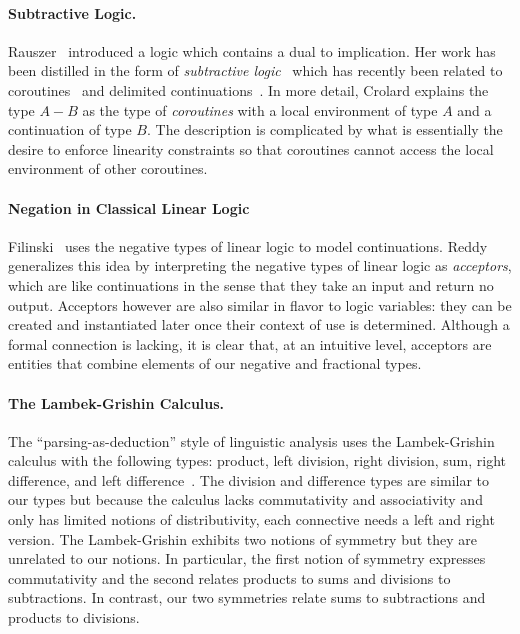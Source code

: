 \documentclass[preprint]{sigplanconf}
\begin{document}
\paragraph*{Subtractive Logic.} 
Rauszer~\cite{springerlink:10.1007/BF02120864,rauszer,rauszer2} introduced a
logic which contains a dual to implication. Her work has been distilled in
the form of \emph{subtractive logic}~\cite{Crolard01} which has recently been
related to coroutines~\cite{Crolard01082004} and delimited
continuations~\cite{Ariola:2009:TFD:1743339.1743381}.  In more detail,
Crolard explains the type $A-B$ as the type of \emph{coroutines} with a local
environment of type $A$ and a continuation of type $B$. The description is
complicated by what is essentially the desire to enforce linearity
constraints so that coroutines cannot access the local environment of other
coroutines. 

\paragraph*{Negation in Classical Linear Logic} 
Filinski~\cite{Filinski92} uses the negative types of linear logic to model
continuations. Reddy~\cite{Reddy91} generalizes this idea by interpreting the
negative types of linear logic as \emph{acceptors}, which are like
continuations in the sense that they take an input and return no
output. Acceptors however are also similar in flavor to logic variables:
they can be created and instantiated later once their context of use is
determined. Although a formal connection is lacking, it is clear that, at an
intuitive level, acceptors are entities that combine elements of our negative
and fractional types.

\paragraph*{The Lambek-Grishin Calculus.} The ``parsing-as-deduction'' style
of linguistic analysis uses the Lambek-Grishin calculus with the following
types: product, left division, right division, sum, right difference, and
left difference~\cite{Bernardi:2010:CSL:1749618.1749689}. The division and
difference types are similar to our types but because the calculus lacks
commutativity and associativity and only has limited notions of
distributivity, each connective needs a left and right version. The
Lambek-Grishin exhibits two notions of symmetry but they are unrelated to our
notions. In particular, the first notion of symmetry expresses commutativity
and the second relates products to sums and divisions to subtractions. In
contrast, our two symmetries relate sums to subtractions and products to
divisions.
\end{document}
